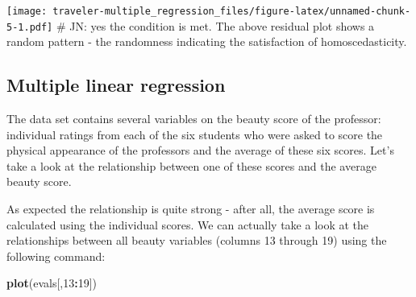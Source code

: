 \documentclass[]{article}
\newenvironment{Shaded}{\begin{snugshade}}{\end{snugshade}}
\newcommand{\KeywordTok}[1]{\textcolor[rgb]{0.13,0.29,0.53}{\textbf{#1}}}
\newcommand{\DataTypeTok}[1]{\textcolor[rgb]{0.13,0.29,0.53}{#1}}
\newcommand{\DecValTok}[1]{\textcolor[rgb]{0.00,0.00,0.81}{#1}}
\newcommand{\StringTok}[1]{\textcolor[rgb]{0.31,0.60,0.02}{#1}}
\newcommand{\CommentTok}[1]{\textcolor[rgb]{0.56,0.35,0.01}{\textit{#1}}}
\newcommand{\OperatorTok}[1]{\textcolor[rgb]{0.81,0.36,0.00}{\textbf{#1}}}
\newcommand{\NormalTok}[1]{#1}
\begin{document}
\begin{Shaded}
\end{Shaded}

\texttt{[image: traveler-multiple\_regression\_files/figure-latex/unnamed-chunk-5-1.pdf]}
\# JN: yes the condition is met. The above residual plot shows a random
pattern - the randomness indicating the satisfaction of
homoscedasticity.

\subsection{Multiple linear
regression}\label{multiple-linear-regression}

The data set contains several variables on the beauty score of the
professor: individual ratings from each of the six students who were
asked to score the physical appearance of the professors and the average
of these six scores. Let's take a look at the relationship between one
of these scores and the average beauty score.

\begin{Shaded}
\end{Shaded}

As expected the relationship is quite strong - after all, the average
score is calculated using the individual scores. We can actually take a
look at the relationships between all beauty variables (columns 13
through 19) using the following command:

\begin{Shaded}
\begin{Highlighting}[]
\KeywordTok{plot}\NormalTok{(evals[,}\DecValTok{13}\OperatorTok{:}\DecValTok{19}\NormalTok{])}
\end{Highlighting}
\end{Shaded}
\end{document}
